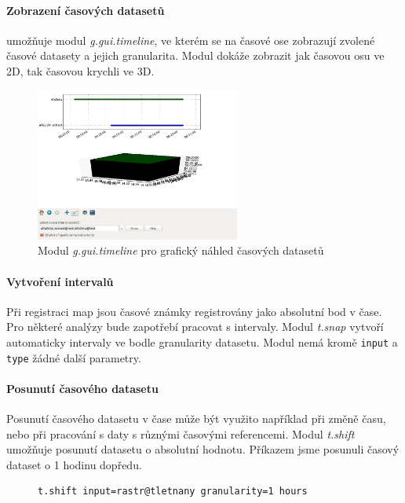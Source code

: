\documentclass[a4paper,12pt,oneside]{report}
\begin{document}
\paragraph*{Zobrazení časových datasetů } umožňuje modul
\emph{g.gui.timeline}, ve kterém se na časové ose zobrazují zvolené
časové datasety a jejich granularita. Modul dokáže zobrazit jak
časovou osu ve 2D, tak časovou krychli ve 3D.

\begin{figure}[h!]
    \centering
    \includegraphics[width=0.6\textwidth]{./img/temporal/timeline.png}
    \caption[Timeline]{\centering  Modul \textit{g.gui.timeline} pro grafický náhled časových datasetů}
 \end{figure}  




 \paragraph*{Vytvoření intervalů} Při registraci map jsou časové
 známky registrovány jako absolutní bod v čase. Pro některé analýzy
 bude zapotřebí pracovat s intervaly. Modul \textit{t.snap} vytvoří
 automaticky intervaly ve bodle granularity datasetu. Modul nemá kromě
 \texttt{input} a \texttt{type} žádné další parametry.



 \paragraph*{Posunutí časového datasetu} Posunutí časového datasetu v
 čase může být využito například při změně času, nebo při pracování s
 daty s různými časovými referencemi. Modul \textit{t.shift} umožňuje
 posunutí datasetu o absolutní hodnotu. Příkazem jsme posunuli časový
 dataset o 1 hodinu dopředu.
\begin{figure}[h!]
\begin{footnotesize}
\lstset{extendedchars=false,
escapeinside=''}
\begin{lstlisting}[style=mybash]
t.shift input=rastr@tletnany granularity=1 hours
\end{lstlisting}
\end{footnotesize} 
\end{figure}
\end{document}
